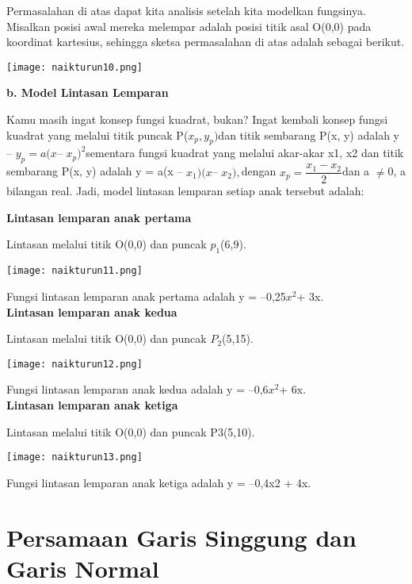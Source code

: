 \documentclass[11pt,fleqn]{book} %
\begin{document}
Permasalahan di atas dapat kita analisis setelah kita modelkan fungsinya. Misalkan posisi awal mereka melempar adalah posisi titik asal O(0,0) pada koordinat kartesius, sehingga sketsa permasalahan di atas adalah sebagai berikut.

\begin{center}
\texttt{[image: naikturun10.png]}
\end{center}

\textbf{b. Model Lintasan Lemparan}

Kamu masih ingat konsep fungsi kuadrat, bukan? Ingat
kembali konsep fungsi kuadrat yang melalui titik puncak
P($x_{p}, y_{p}) $dan titik sembarang P(x, y) adalah y – $y_{p} = a(x
$– $x_{p})^2 $sementara fungsi kuadrat yang melalui akar-akar x1,
x2 dan titik sembarang P(x, y) adalah y = a(x – $x_{1})(x $– $x_{2}),
$dengan $x_{p}= \dfrac{x_{1}-x_{2}}{2}
$dan a $\neq $0, a bilangan real. Jadi, model
lintasan lemparan setiap anak tersebut adalah:

\textbf{Lintasan lemparan anak pertama}

Lintasan melalui titik O(0,0) dan puncak $p_{1}$(6,9).

\texttt{[image: naikturun11.png]}

Fungsi lintasan lemparan anak pertama adalah y = –0,25$x^{2} $+ 3x.\\

\textbf{Lintasan lemparan anak kedua}

Lintasan melalui titik O(0,0) dan puncak $P_{2}$(5,15).

\texttt{[image: naikturun12.png]}

Fungsi lintasan lemparan anak kedua adalah y = –0,6$x^{2} $+ 6x.\\

\textbf{Lintasan lemparan anak ketiga}

Lintasan melalui titik O(0,0) dan puncak P3(5,10).

\texttt{[image: naikturun13.png]}

Fungsi lintasan lemparan anak ketiga adalah y = –0,4x2 +
4x.

\section{Persamaan Garis Singgung dan Garis Normal}
\end{document}
